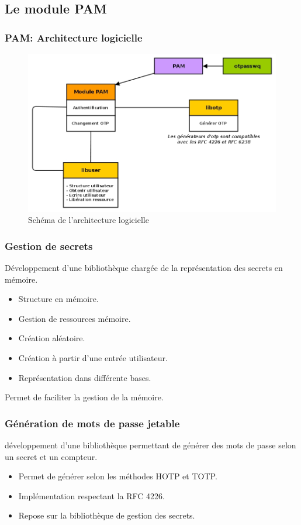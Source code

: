 \documentclass[xcolor=table]{beamer}
\begin{document}
\subsection{Le module PAM}
\begin{frame}
\frametitle{PAM: Architecture logicielle}
\begin{figure}
 \includegraphics[scale=0.3]{../graphics/architecturepammodule.jpg} 
 \caption{Schéma de l'architecture logicielle}
\end{figure}

\end{frame}
\begin{frame}
\frametitle{Gestion de secrets}
Développement d'une bibliothèque chargée de la représentation des secrets en mémoire.
\begin{itemize}
  \item Structure en mémoire.
  \item Gestion de ressources mémoire.
  \item Création aléatoire.
  \item Création à partir d'une entrée utilisateur.
  \item Représentation dans différente bases.
\end{itemize}

Permet de faciliter la gestion de la mémoire.
\end{frame}

\begin{frame}
\frametitle{Génération de mots de passe jetable}
développement d'une bibliothèque permettant de générer des mots de passe selon un secret
et un compteur.
\begin{itemize}
\item Permet de générer selon les méthodes HOTP et TOTP.
\item Implémentation respectant la RFC 4226.
\item Repose sur la bibliothèque de gestion des secrets.
\end{itemize}

\end{frame}
\end{document}
